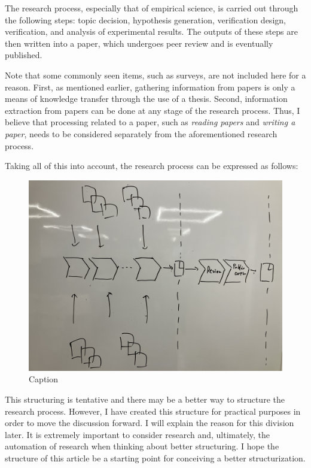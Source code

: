 \documentclass{book}
\begin{document}
The research process, especially that of empirical science, is carried out through the following steps: topic decision, hypothesis generation, verification design, verification, and analysis of experimental results. The outputs of these steps are then written into a paper, which undergoes peer review and is eventually published.

Note that some commonly seen items, such as surveys, are not included here for a reason. First, as mentioned earlier, gathering information from papers is only a means of knowledge transfer through the use of a thesis. Second, information extraction from papers can be done at any stage of the research process. Thus, I believe that processing related to a paper, such as \textit{reading papers} and \textit{writing a paper}, needs to be considered separately from the aforementioned research process.

Taking all of this into account, the research process can be expressed as follows:

\begin{figure}[htb]
    \centering
    \includegraphics[width=\textwidth]{figs/researchprocess.jpg}
    \caption{Caption}
    \label{fig:research_process}
\end{figure}

This structuring is tentative and there may be a better way to structure the research process. However, I have created this structure for practical purposes in order to move the discussion forward. I will explain the reason for this division later. It is extremely important to consider research and, ultimately, the automation of research when thinking about better structuring. I hope the structure of this article be a starting point for conceiving a better structurization.
\end{document}
